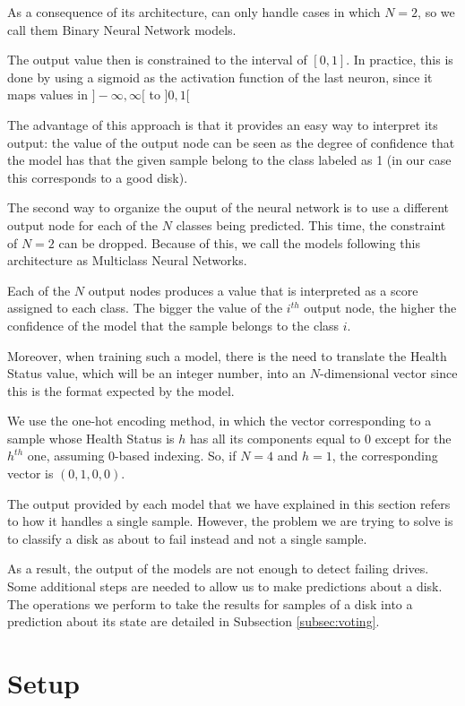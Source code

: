 As a consequence of its architecture, can only handle cases in which $N = 2$, so we call them Binary Neural Network models.

The output value then is constrained to the interval of $[0,1]$.
In practice, this is done by using a sigmoid as the activation function of the last neuron, since it maps values in $]-\infty,\infty[$ to $]0,1[$

The advantage of this approach is that it provides an easy way to interpret its output: the value of the output node can be seen as the degree of confidence that the model has that the given sample belong to the class labeled as 1 (in our case this corresponds to a good disk).

The second way to organize the ouput of the neural network is to use a different output node for each of the $N$ classes being predicted.
This time, the constraint of $N=2$ can be dropped.
Because of this, we call the models following this architecture as Multiclass Neural Networks.

Each of the $N$ output nodes produces a value that is interpreted as a score assigned to each class.
The bigger the value of the $i^{th}$ output node, the higher the confidence of the model that the sample belongs to the class $i$.

Moreover, when training such a model, there is the need to translate the Health Status value, which will be an integer number, into an $N$-dimensional vector since this is the format expected by the model.

We use the one-hot encoding method, in which the vector corresponding to a sample whose Health Status is $h$ has all its components equal to 0 except for the $h^{th}$ one, assuming 0-based indexing.
So, if $N = 4$ and $h = 1$, the corresponding vector is $(0,1,0,0)$.

The output provided by each model that we have explained in this section refers to how it handles a single sample.
However, the problem we are trying to solve is to classify a disk as about to fail instead and not a single sample.

As a result, the output of the models are not enough to detect failing drives.
Some additional steps are needed to allow us to make predictions about a disk.
The operations we perform to take the results for samples of a disk into a prediction about its state are detailed in Subsection \ref{subsec:voting}.

\section{Setup}\label{sec:setup}

